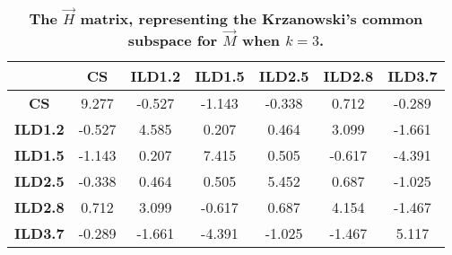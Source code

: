 \begin{table}[!htp]
\caption[The $\vec{H}$ matrix, representing the Krzanowski's common subspace for $\vec{M}$ when $k=3$.]{\textbf{The $\vec{H}$ matrix, representing the Krzanowski's common subspace for $\vec{M}$ when $k=3$.}}
\label{tab:multi_suppH_k3}
\begin{center}
\begin{tabular}{>{\bfseries}cS[table-format=-1.3]S[table-format=-1.3]S[table-format=-1.3]S[table-format=-1.3]S[table-format=-1.3]S[table-format=-1.3]}
\toprule
&\textbf{CS} &  \textbf{ILD1.2} & \textbf{ILD1.5} & \textbf{ILD2.5} &  \textbf{ILD2.8} & \textbf{ILD3.7} \\ 
\midrule   
CS & 9.277 & -0.527& -1.143& -0.338& 0.712 & -0.289\\
 ILD1.2  & -0.527& 4.585 & 0.207 & 0.464 & 3.099 & -1.661\\
 ILD1.5 & -1.143& 0.207 & 7.415 & 0.505 & -0.617& -4.391\\
ILD2.5 & -0.338& 0.464 & 0.505 & 5.452 & 0.687 & -1.025\\
 ILD2.8 & 0.712 & 3.099 & -0.617& 0.687 & 4.154 & -1.467\\
 ILD3.7  & -0.289& -1.661& -4.391& -1.025& -1.467& 5.117\\
\bottomrule
\end{tabular}
\end{center}
\end{table}


